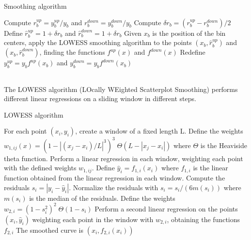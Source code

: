 \begin{algorithm}[H]
\caption{Smoothing algorithm}\label{algo:smooth}
\begin{algorithmic}[1]
    \State Compute $r^{up}_b=y_{b}^{up}/y_b$ and $r^{down}_b=y_{b}^{down}/y_b$
    \State Compute $\delta r_b=\left(r^{up}_b-r^{down}_b\right)/2$
    \State Define $\hat{r}^{up}_b=1+\delta r_b$ and $\hat{r}^{down}_b=1+\delta r_b$
    \State Given $x_b$ is the position of the bin centers, apply the LOWESS smoothing algorithm to the points $(x_b,\hat{r}^{up}_b)$ and $(x_b,\hat{r}^{down}_b)$, finding the functions $f^{up}(x)$ and $f^{down}(x)$
    \State Redefine $y_b^{up}=y_b f^{up}(x_b)$ and $y_b^{down}=y_b f^{down}(x_b)$
\end{algorithmic}
\end{algorithm}
\\
The LOWESS algorithm \cite{Cleveland1979RobustScatterplots} (LOcally WEighted Scatterplot Smoothing) performs different linear regressions on a sliding window in different steps.


\begin{algorithm}[H]
\caption{LOWESS algorithm}\label{algo:LOWESS}
\begin{algorithmic}[1]

    \State For each point $(x_i,y_i)$, create a window of a fixed length L.
    \State Define the weights $w_{1,ij}(x)=(1-|(x_j-x_i)/L|^3)^3 \; \Theta(L-|x_j-x_i|)$ where $\Theta$ is the Heaviside theta function.
    \State Perform a linear regression in each window, weighting each point with the defined weights $w_{1,ij}$. 
    \State Define $\hat{y}_i=f_{1,i}(x_i)$ where $f_{1,i}$ is the linear function obtained from the linear regression in each window.
    \State Compute the residuals $s_i=|y_i-\hat{y}_i|$.
    \State Normalize the residuals with $s_i=s_i/(6 m(s_i))$ where $m(s_i)$ is the median of the residuals.
    \State Define the weights $w_{2,i}=(1-s_i^2)^2 \; \Theta(1-s_i)$ 
    \State Perform a second linear regression on the points $(x_i,\hat{y}_i)$ weighting each point in the window with $w_{2,i}$, obtaining the functions $f_{2,i}$
    \State The smoothed curve is $(x_i,f_{2,i}(x_i))$

\end{algorithmic}
\end{algorithm}



